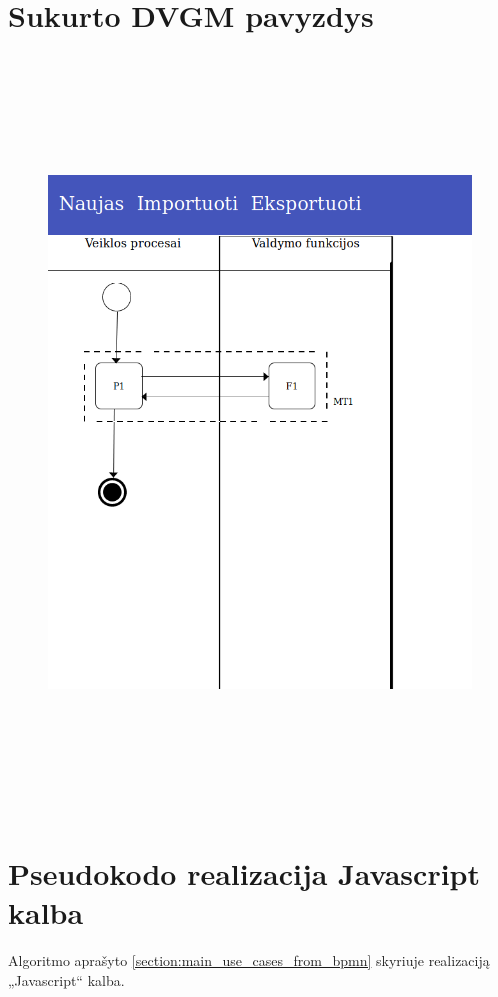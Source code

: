 \documentclass{VUMIFInfBakalaurinis}
\begin{document}
\section{Sukurto DVGM pavyzdys} \label{appendix:run_examples_created_dvcm}
\begin{figure}[H]
    \centering
    \includegraphics[height=20cm]{img/appendix/run_examples/created_dvcm}
\end{figure}


\section{Pseudokodo realizacija Javascript kalba} \label{appendix:pseudocode_implementation}
Algoritmo aprašyto \ref{section:main_use_cases_from_bpmn} skyriuje realizaciją „Javascript“ kalba.

\end{document}
